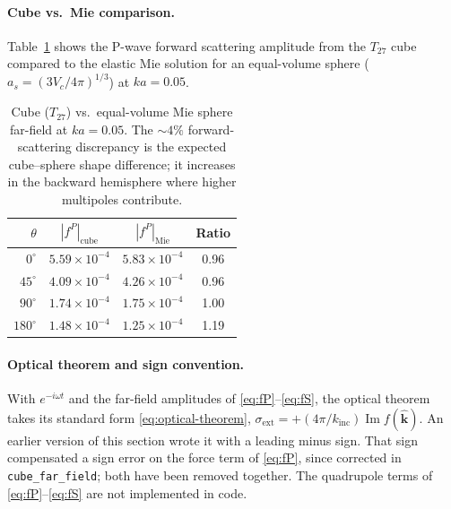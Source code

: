 \paragraph{Cube vs.\ Mie comparison.}
Table~\ref{tab:cube-vs-mie} shows the P-wave forward scattering amplitude
from the $T_{27}$ cube compared to the elastic Mie solution for an
equal-volume sphere ($a_s = (3V_c/4\pi)^{1/3}$) at $ka = 0.05$.

\begin{table}[ht]
\centering
\renewcommand{\arraystretch}{1.2}
\begin{tabular}{rccc}
\toprule
$\theta$ & $|f^P|_{\mathrm{cube}}$ & $|f^P|_{\mathrm{Mie}}$ & Ratio \\
\midrule
$0^\circ$   & $5.59 \times 10^{-4}$ & $5.83 \times 10^{-4}$ & 0.96 \\
$45^\circ$  & $4.09 \times 10^{-4}$ & $4.26 \times 10^{-4}$ & 0.96 \\
$90^\circ$  & $1.74 \times 10^{-4}$ & $1.75 \times 10^{-4}$ & 1.00 \\
$180^\circ$ & $1.48 \times 10^{-4}$ & $1.25 \times 10^{-4}$ & 1.19 \\
\bottomrule
\end{tabular}
\caption{Cube ($T_{27}$) vs.\ equal-volume Mie sphere far-field at
$ka = 0.05$.  The $\sim\!4\%$ forward-scattering discrepancy is the
expected cube--sphere shape difference; it increases in the
backward hemisphere where higher multipoles contribute.}
\label{tab:cube-vs-mie}
\end{table}

\paragraph{Optical theorem and sign convention.}
With $e^{-i\omega t}$ and the far-field amplitudes of
\eqref{eq:fP}--\eqref{eq:fS}, the optical theorem takes its standard form
\eqref{eq:optical-theorem}, $\sigma_{\mathrm{ext}} = +(4\pi/k_{\mathrm{inc}})
\operatorname{Im} f(\hat{\bm{k}})$. An earlier version of this section wrote it
with a leading minus sign. That sign compensated a sign error on the force term
of \eqref{eq:fP}, since corrected in \texttt{cube\_far\_field}; both have been
removed together. The quadrupole terms of \eqref{eq:fP}--\eqref{eq:fS} are not
implemented in code.

